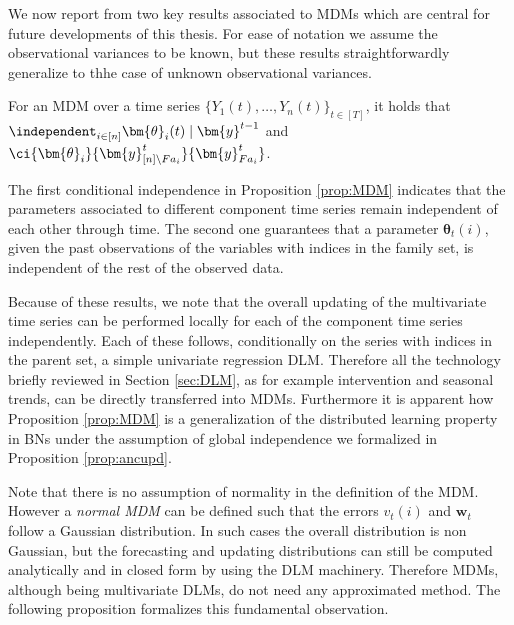 We now report from \citet{Queen1993} two key results associated to \glspl{MDM} which are central for future developments of this thesis. For ease of notation we assume the observational variances to be known, but these results straightforwardly generalize to thhe case of unknown observational variances. 

\begin{proposition}
\label{prop:MDM}
For an \gls{MDM} over a time series $\{Y_1(t),\dots,Y_n(t)\}_{t\in[T]}$, it holds that 
$\independent_{i\in[n]}\bm{\theta}_i(t)\;|\; \bm{y}^{t-1}$  and $
\ci{\bm{\theta}_i}{\bm{y}^t_{[n]\setminus Fa_i}}{\bm{y}_{Fa_i}^t}$.
\end{proposition}
The first conditional independence in Proposition \ref{prop:MDM} indicates that the parameters associated to different component time series remain independent of each other through time. The second one guarantees that a parameter $\bm{\theta}_t(i)$, given the past observations of the variables with indices in the family set, is independent of the rest of the observed data. 

Because of these results, we note that the overall updating of the multivariate time series can be performed locally for each of the component time series independently. Each of these follows, conditionally on the series with indices in the parent set, a simple univariate regression \gls{DLM}. Therefore all the technology briefly reviewed in Section \ref{sec:DLM}, as for example intervention and seasonal trends, can be directly transferred into \glspl{MDM}. Furthermore it is apparent how Proposition \ref{prop:MDM} is a generalization of the distributed learning property in \glspl{BN} under the assumption of global independence we formalized in Proposition \ref{prop:ancupd}.

Note that there is no assumption of normality in the definition of the \gls{MDM}. However a \textit{normal \gls{MDM}} can be defined such that the errors $v_t(i)$ and $\bm{w}_t$ follow a Gaussian distribution. In such cases the overall distribution is non Gaussian, but the forecasting and updating distributions can still be computed analytically and in closed form by using the \gls{DLM} machinery. Therefore \glspl{MDM}, although being multivariate \glspl{DLM}, do not need any approximated method. The following proposition formalizes this fundamental observation.

